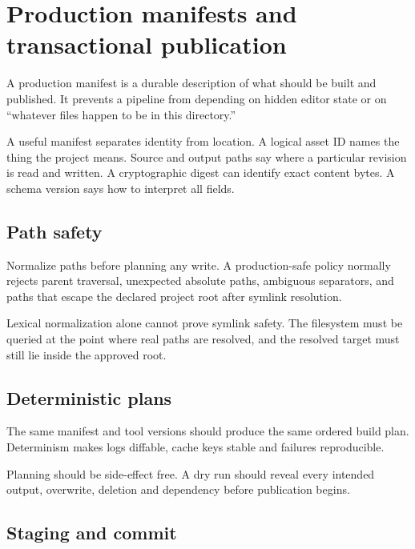 \hypertarget{appendix-91eaa3cbdbc3}{}\label{referencestart:appendix-91eaa3cbdbc3}
\section{Production manifests and transactional publication}\label{appendix-91eaa3cbdbc3-production-manifests-and-transactional-publication}

A production manifest is a durable description of what should be built and published. It prevents a pipeline from depending on hidden editor state or on ``whatever files happen to be in this directory.''

A useful manifest separates identity from location. A logical asset ID names the thing the project means. Source and output paths say where a particular revision is read and written. A cryptographic digest can identify exact content bytes. A schema version says how to interpret all fields.

\subsection{Path safety}\label{appendix-91eaa3cbdbc3-path-safety}

Normalize paths before planning any write. A production-safe policy normally rejects parent traversal, unexpected absolute paths, ambiguous separators, and paths that escape the declared project root after symlink resolution.

Lexical normalization alone cannot prove symlink safety. The filesystem must be queried at the point where real paths are resolved, and the resolved target must still lie inside the approved root.

\subsection{Deterministic plans}\label{appendix-91eaa3cbdbc3-deterministic-plans}

The same manifest and tool versions should produce the same ordered build plan. Determinism makes logs diffable, cache keys stable and failures reproducible.

Planning should be side-effect free. A dry run should reveal every intended output, overwrite, deletion and dependency before publication begins.

\subsection{Staging and commit}\label{appendix-91eaa3cbdbc3-staging-and-commit}

